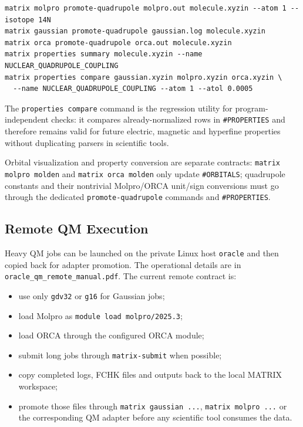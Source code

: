 \documentclass[11pt]{article}
\newcommand{\sectionname}[1]{\texttt{\##1}}
\begin{document}
\begin{lstlisting}[style=matrix]
matrix molpro promote-quadrupole molpro.out molecule.xyzin --atom 1 --isotope 14N
matrix gaussian promote-quadrupole gaussian.log molecule.xyzin
matrix orca promote-quadrupole orca.out molecule.xyzin
matrix properties summary molecule.xyzin --name NUCLEAR_QUADRUPOLE_COUPLING
matrix properties compare gaussian.xyzin molpro.xyzin orca.xyzin \
  --name NUCLEAR_QUADRUPOLE_COUPLING --atom 1 --atol 0.0005
\end{lstlisting}

The \texttt{properties compare} command is the regression utility for
program-independent checks: it compares already-normalized rows in
\sectionname{PROPERTIES} and therefore remains valid for future electric,
magnetic and hyperfine properties without duplicating parsers in scientific
tools.

Orbital visualization and property conversion are separate contracts:
\texttt{matrix molpro molden} and \texttt{matrix orca molden} only update
\sectionname{ORBITALS}; quadrupole constants and their nontrivial Molpro/ORCA
unit/sign conversions must go through the dedicated \texttt{promote-quadrupole}
commands and \sectionname{PROPERTIES}.

\subsection{Remote QM Execution}

Heavy QM jobs can be launched on the private Linux host \texttt{oracle} and
then copied back for adapter promotion.  The operational details are in
\texttt{oracle\_qm\_remote\_manual.pdf}.  The current remote contract is:

\begin{itemize}
  \item use only \texttt{gdv32} or \texttt{g16} for Gaussian jobs;
  \item load Molpro as \texttt{module load molpro/2025.3};
  \item load ORCA through the configured ORCA module;
  \item submit long jobs through \texttt{matrix-submit} when possible;
  \item copy completed logs, FCHK files and outputs back to the local MATRIX
        workspace;
  \item promote those files through \texttt{matrix gaussian ...},
        \texttt{matrix molpro ...} or the corresponding QM adapter before any
        scientific tool consumes the data.
\end{itemize}
\end{document}
